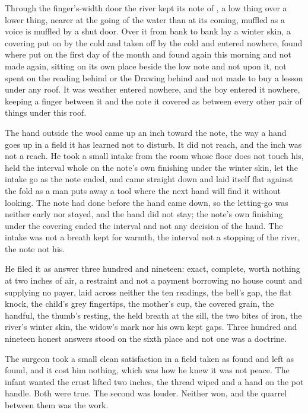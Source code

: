\scenebreak

Through the finger's-width door the river kept its note of , a low thing over a lower thing, nearer at the going of the water than at its coming, muffled as a voice is muffled by a shut door. Over it from bank to bank lay a winter skin, a covering put on by the cold and taken off by the cold and entered nowhere, found where put on the first day of the month and found again this morning and not made again, sitting on its own place beside the low note and not upon it, not spent on the reading behind or the Drawing behind and not made to buy a lesson under any roof. It was weather entered nowhere, and the boy entered it nowhere, keeping a finger between it and the note it covered as between every other pair of things under this roof.

The hand outside the wool came up an inch toward the note, the way a hand goes up in a field it has learned not to disturb. It did not reach, and the inch was not a reach. He took a small intake from the room whose floor does not touch his, held the interval whole on the note's own finishing under the winter skin, let the intake go as the note ended, and came straight down and laid itself flat against the fold as a man puts away a tool where the next hand will find it without looking. The note had done before the hand came down, so the letting-go was neither early nor stayed, and the hand did not stay; the note's own finishing under the covering ended the interval and not any decision of the hand. The intake was not a breath kept for warmth, the interval not a stopping of the river, the note not his.

He filed it as answer three hundred and nineteen: exact, complete, worth nothing at two inches of air, a restraint and not a payment borrowing no house count and supplying no payer, laid across neither the ten readings, the bell's gap, the flat knock, the child's grey fingertips, the mother's cup, the covered grain, the handful, the thumb's resting, the held breath at the sill, the two bites of iron, the river's winter skin, the widow's mark nor his own kept gaps. Three hundred and nineteen honest answers stood on the sixth place and not one was a doctrine.

The surgeon took a small clean satisfaction in a field taken as found and left as found, and it cost him nothing, which was how he knew it was not peace. The infant wanted the crust lifted two inches, the thread wiped and a hand on the pot handle. Both were true. The second was louder. Neither won, and the quarrel between them was the work.


